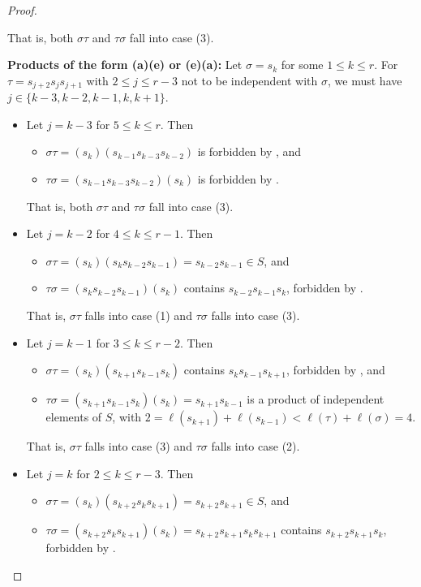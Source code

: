 \documentclass[10pt,a4paper]{amsart}
\begin{document}
\begin{proof}
\begin{itemize}
        That is, both $\sigma\tau$ and $\tau\sigma$ fall into case (3).
    \end{itemize}
\smallskip
\noindent \textbf{Products of the form (a)(e) or (e)(a):}
    Let $\sigma=s_k$ for some $1\leq k\leq r$. For $\tau=s_{j+2}s_{j}s_{j+1}$ with $2\leq j\leq r-3$ not to be independent with $\sigma$, we must have $j\in\{k-3, k-2, k-1, k, k+1\}$.
    \begin{itemize}
        \item Let $j=k-3$ for $5\leq k\leq r$. Then \begin{itemize}
            \item $\sigma\tau= (s_{k})(s_{k-1}s_{k-3}s_{k-2})$ is forbidden by , and
            \item $\tau\sigma=(s_{k-1}s_{k-3}s_{k-2})(s_{k})$ is forbidden by .
        \end{itemize}
        That is, both $\sigma\tau$ and $\tau\sigma$ fall into case (3).
        \item Let $j=k-2$ for $4\leq k\leq r-1$. Then \begin{itemize}
            \item $\sigma\tau= (s_{k})(s_{k}s_{k-2}s_{k-1}) = s_{k-2}s_{k-1}\in S$, and
            \item $\tau\sigma= (s_{k}s_{k-2}s_{k-1})(s_{k})$ contains $s_{k-2}s_{k-1}s_k$, forbidden by .
        \end{itemize}
        That is, $\sigma\tau$ falls into case (1) and $\tau\sigma$ falls into case (3).
        \item Let $j=k-1$ for $3\leq k\leq r-2$. Then \begin{itemize}
            \item $\sigma\tau= (s_{k})(s_{k+1}s_{k-1}s_{k})$ contains $s_{k}s_{k-1}s_{k+1}$, forbidden by , and
            \item $\tau\sigma= (s_{k+1}s_{k-1}s_{k})(s_{k}) = s_{k+1}s_{k-1}$ is a product of independent elements of $S$, with $2=\ell(s_{k+1})+\ell(s_{k-1})<\ell(\tau)+\ell(\sigma)=4$.
        \end{itemize}
        That is, $\sigma\tau$ falls into case (3) and $\tau\sigma$ falls into case (2).
        \item Let $j=k$ for $2\leq k\leq r-3$. Then \begin{itemize}
            \item $\sigma\tau= (s_{k})(s_{k+2}s_{k}s_{k+1}) = s_{k+2}s_{k+1}\in S$, and
            \item $\tau\sigma= (s_{k+2}s_{k}s_{k+1})(s_{k})=s_{k+2}s_{k+1}s_ks_{k+1}$ contains $s_{k+2}s_{k+1}s_k$, forbidden by .

\end{itemize}
\end{itemize}
\end{proof}
\end{document}
